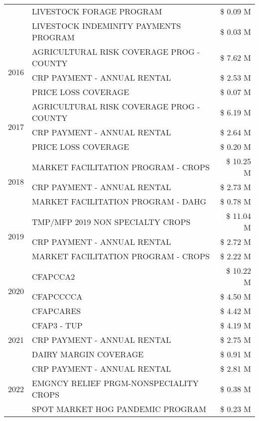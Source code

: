 \begin{tabular}{llr}
 & LIVESTOCK FORAGE PROGRAM & \$ 0.09 M \\
 & LIVESTOCK INDEMINITY PAYMENTS PROGRAM & \$ 0.03 M \\
\cline{1-3}
\multirow[t]{3}{*}{2016} & AGRICULTURAL RISK COVERAGE PROG - COUNTY & \$ 7.62 M \\
 & CRP PAYMENT - ANNUAL RENTAL & \$ 2.53 M \\
 & PRICE LOSS COVERAGE & \$ 0.07 M \\
\cline{1-3}
\multirow[t]{3}{*}{2017} & AGRICULTURAL RISK COVERAGE PROG - COUNTY & \$ 6.19 M \\
 & CRP PAYMENT - ANNUAL RENTAL & \$ 2.64 M \\
 & PRICE LOSS COVERAGE & \$ 0.20 M \\
\cline{1-3}
\multirow[t]{3}{*}{2018} & MARKET FACILITATION PROGRAM - CROPS & \$ 10.25 M \\
 & CRP PAYMENT - ANNUAL RENTAL & \$ 2.73 M \\
 & MARKET FACILITATION PROGRAM - DAHG & \$ 0.78 M \\
\cline{1-3}
\multirow[t]{3}{*}{2019} & TMP/MFP 2019 NON SPECIALTY CROPS & \$ 11.04 M \\
 & CRP PAYMENT - ANNUAL RENTAL & \$ 2.72 M \\
 & MARKET FACILITATION PROGRAM - CROPS & \$ 2.22 M \\
\cline{1-3}
\multirow[t]{3}{*}{2020} & CFAPCCA2 & \$ 10.22 M \\
 & CFAPCCCCA & \$ 4.50 M \\
 & CFAPCARES & \$ 4.42 M \\
\cline{1-3}
\multirow[t]{3}{*}{2021} & CFAP3 - TUP & \$ 4.19 M \\
 & CRP PAYMENT - ANNUAL RENTAL & \$ 2.75 M \\
 & DAIRY MARGIN COVERAGE & \$ 0.91 M \\
\cline{1-3}
\multirow[t]{3}{*}{2022} & CRP PAYMENT - ANNUAL RENTAL & \$ 2.81 M \\
 & EMGNCY RELIEF PRGM-NONSPECIALITY CROPS & \$ 0.38 M \\
 & SPOT MARKET HOG PANDEMIC PROGRAM & \$ 0.23 M \\
\cline{1-3}
\bottomrule
\end{tabular}
